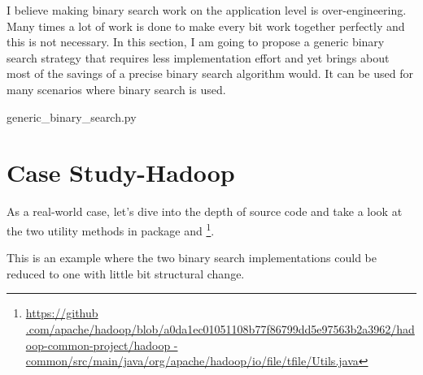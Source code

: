 I believe making binary search work on the application level is over-engineering.
Many times a lot of work is done to make every bit work together perfectly and this is not
necessary.
In this section, I am going to propose a generic binary search strategy that requires less
implementation effort and yet brings about most of the savings of a precise binary search algorithm
would.
It can be used for many scenarios where binary search is used.
\begin{clisting}
    
    {generic_binary_search.py}
\end{clisting}


\section{Case Study-Hadoop}
As a real-world case, let's dive into the depth of  source code and take a look at
the two utility methods in package 
 and  \footnote{\url{https://github
.com/apache/hadoop/blob/a0da1ec01051108b77f86799dd5e97563b2a3962/hadoop-common-project/hadoop
-common/src/main/java/org/apache/hadoop/io/file/tfile/Utils.java}}.

This is an example where the two binary search implementations could be reduced to one with
little bit structural change.
